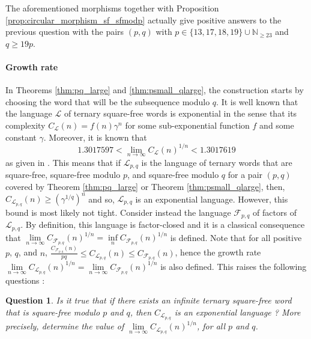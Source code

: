 \documentclass[12pt]{article}
\newtheorem{question}[theorem]{Question}
\theoremstyle{definition}
\begin{document}
The aforementioned morphisms together with Proposition \ref{prop:circular_morphism_sf_sfmodp} actually give positive answers to the previous question with the pairs $(p, q)$ with $p \in \{13, 17, 18, 19\} \cup \mathbb{N}_{\geq 23}$ and $q \ge 19p$.

\paragraph{Growth rate}

  

In Theorems \ref{thm:pq_large} and \ref{thm:psmall_qlarge}, the construction starts by choosing the word that will be the subsequence modulo $q$. It is well known that the language $\mathcal{L}$ of ternary square-free words is exponential in the sense that its complexity $C_\mathcal{L}(n) = f(n)\gamma^n$ for some sub-exponential function $f$ and some constant $\gamma$. Moreover, it is known that $$1.3017597< \lim\limits_{n \rightarrow \infty} C_\mathcal{L}(n)^{1/n} < 1.3017619$$  as given in \cite{SHUR2012187}. This means that if $\mathcal{L}_{p, q}$ is the language of ternary words that are square-free, square-free modulo $p$, and square-free modulo $q$ for a pair $(p, q)$ covered by Theorem \ref{thm:pq_large} or Theorem \ref{thm:psmall_qlarge}, then, $C_{\mathcal{L}_{p, q}}(n) \ge (\gamma^{1/q})^n$ and so, $\mathcal{L}_{p, q}$ is an exponential language. However, this bound is most likely not tight.
Consider instead the language $\mathcal{F}_{p, q}$ of factors of $\mathcal{L}_{p, q}$. By definition, this language is factor-closed and it is a classical consequence that $\lim\limits_{n \rightarrow \infty} C_{\mathcal{F}_{p, q}}(n)^{1/n}
= \inf\limits_{n}C_{\mathcal{F}_{p, q}}(n)^{1/n}$ is defined. Note that for all positive $p$, $q$, and $n$,
$\frac{C_{\mathcal{F}_{p, q}}(n)}{pq}\le C_{\mathcal{L}_{p, q}}(n)\le C_{\mathcal{F}_{p, q}}(n)$, hence the growth rate $\lim\limits_{n \rightarrow \infty} C_{\mathcal{L}_{p, q}}(n)^{1/n}=\lim\limits_{n \rightarrow \infty} C_{\mathcal{F}_{p, q}}(n)^{1/n}$ is also defined. This raises the following questions :

\begin{question}
Is it true that if there exists an infinite ternary square-free word that is square-free modulo $p$ and $q$, then $C_{\mathcal{L}_{p, q}}$ is an exponential language ? More precisely, determine the value of $\lim\limits_{n \rightarrow \infty} C_{\mathcal{L}_{p, q}}(n)^{1/n}$, for all $p$ and $q$. \end{question}
\end{document}
